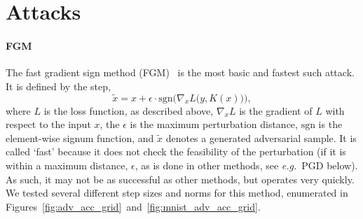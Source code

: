 \documentclass[lettersize,journal]{IEEEtran}
\newcommand{\eg}{\textit{e.g.}\xspace}
\newcommand{\erik}[1]{\textit{[{\color{brown}Erik: #1}]}}
\begin{document}
\section{Attacks}
\label{attacks}





\paragraph{FGM}

The fast gradient sign method (FGM)~\cite{fgm} is the most basic and fastest such attack. It is defined by the step,
$$
   \widetilde{x} = x + \epsilon \cdot \textrm{sgn}\Big(\nabla_{x} L\big(y, K(x)\big)\Big),
$$
where $L$ is the loss function, as described above, $\nabla_{x} L$ is the gradient of $L$ with respect to the input $x$, the $\epsilon$ is the maximum perturbation distance, $\textrm{sgn}$ is the element-wise signum function, and $\widetilde{x}$ denotes a generated adversarial sample. It is called `fast' because it does not check the feasibility of the perturbation (if it is within a maximum distance, $\epsilon$, as is done in other methods, see \eg~PGD below).
%
%
As such, it may not be as successful as other methods, but operates very quickly. We tested several different step sizes and norms for this method, enumerated in Figures~\ref{fig:adv_acc_grid}~and~\ref{fig:mnist_adv_acc_grid}.
\end{document}

